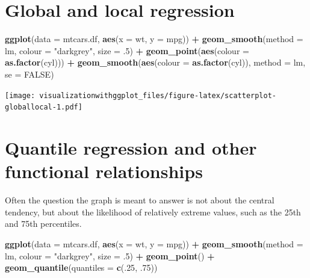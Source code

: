 \documentclass[]{krantz}
\makeatletter
\newenvironment{Shaded}{\begin{snugshade}}{\end{snugshade}}
\newcommand{\KeywordTok}[1]{\textcolor[rgb]{0.13,0.29,0.53}{\textbf{#1}}}
\newcommand{\DataTypeTok}[1]{\textcolor[rgb]{0.13,0.29,0.53}{#1}}
\newcommand{\DecValTok}[1]{\textcolor[rgb]{0.00,0.00,0.81}{#1}}
\newcommand{\StringTok}[1]{\textcolor[rgb]{0.31,0.60,0.02}{#1}}
\newcommand{\OtherTok}[1]{\textcolor[rgb]{0.56,0.35,0.01}{#1}}
\newcommand{\OperatorTok}[1]{\textcolor[rgb]{0.81,0.36,0.00}{\textbf{#1}}}
\newcommand{\NormalTok}[1]{#1}
\newenvironment{kframe}{%
\medskip{}
\setlength{\fboxsep}{.8em}
 \def\at@end@of@kframe{}%
 \ifinner\ifhmode%
  \def\at@end@of@kframe{\end{minipage}}%
  \begin{minipage}{\columnwidth}%
 \fi\fi%
 \def\FrameCommand##1{\hskip\@totalleftmargin \hskip-\fboxsep
 \colorbox{shadecolor}{##1}\hskip-\fboxsep
     \hskip-\linewidth \hskip-\@totalleftmargin \hskip\columnwidth}%
 \MakeFramed {\advance\hsize-\width
   \@totalleftmargin\z@ \linewidth\hsize
   \@setminipage}}%
 {\par\unskip\endMakeFramed%
 \at@end@of@kframe}
\renewenvironment{Shaded}{\begin{kframe}}{\end{kframe}}
\theoremstyle{definition}
\theoremstyle{definition}
\theoremstyle{definition}
\theoremstyle{remark}
\makeatother
\begin{document}
\section{Global and local regression}\label{global-and-local-regression}

\begin{Shaded}
\begin{Highlighting}[]
\KeywordTok{ggplot}\NormalTok{(}\DataTypeTok{data =}\NormalTok{ mtcars.df, }\KeywordTok{aes}\NormalTok{(}\DataTypeTok{x =}\NormalTok{ wt, }\DataTypeTok{y =}\NormalTok{ mpg)) }\OperatorTok{+}
\StringTok{    }\KeywordTok{geom_smooth}\NormalTok{(}\DataTypeTok{method =}\NormalTok{ lm, }\DataTypeTok{colour =} \StringTok{"darkgrey"}\NormalTok{, }\DataTypeTok{size =}\NormalTok{ .}\DecValTok{5}\NormalTok{) }\OperatorTok{+}
\StringTok{  }\KeywordTok{geom_point}\NormalTok{(}\KeywordTok{aes}\NormalTok{(}\DataTypeTok{colour =} \KeywordTok{as.factor}\NormalTok{(cyl))) }\OperatorTok{+}
\StringTok{  }\KeywordTok{geom_smooth}\NormalTok{(}\KeywordTok{aes}\NormalTok{(}\DataTypeTok{colour =} \KeywordTok{as.factor}\NormalTok{(cyl)), }\DataTypeTok{method =}\NormalTok{ lm, }\DataTypeTok{se =} \OtherTok{FALSE}\NormalTok{)}
\end{Highlighting}
\end{Shaded}

\texttt{[image: visualizationwithggplot\_files/figure-latex/scatterplot-globallocal-1.pdf]}

\section{Quantile regression and other functional
relationships}\label{quantile-regression-and-other-functional-relationships}

Often the question the graph is meant to answer is not about the central
tendency, but about the likelihood of relatively extreme values, such as
the 25th and 75th percentiles.

\begin{Shaded}
\begin{Highlighting}[]
\KeywordTok{ggplot}\NormalTok{(}\DataTypeTok{data =}\NormalTok{ mtcars.df, }\KeywordTok{aes}\NormalTok{(}\DataTypeTok{x =}\NormalTok{ wt, }\DataTypeTok{y =}\NormalTok{ mpg)) }\OperatorTok{+}
\StringTok{    }\KeywordTok{geom_smooth}\NormalTok{(}\DataTypeTok{method =}\NormalTok{ lm, }\DataTypeTok{colour =} \StringTok{"darkgrey"}\NormalTok{, }\DataTypeTok{size =}\NormalTok{ .}\DecValTok{5}\NormalTok{) }\OperatorTok{+}
\StringTok{  }\KeywordTok{geom_point}\NormalTok{() }\OperatorTok{+}
\StringTok{  }\KeywordTok{geom_quantile}\NormalTok{(}\DataTypeTok{quantiles =} \KeywordTok{c}\NormalTok{(.}\DecValTok{25}\NormalTok{, .}\DecValTok{75}\NormalTok{))}
\end{Highlighting}
\end{Shaded}
\end{document}
